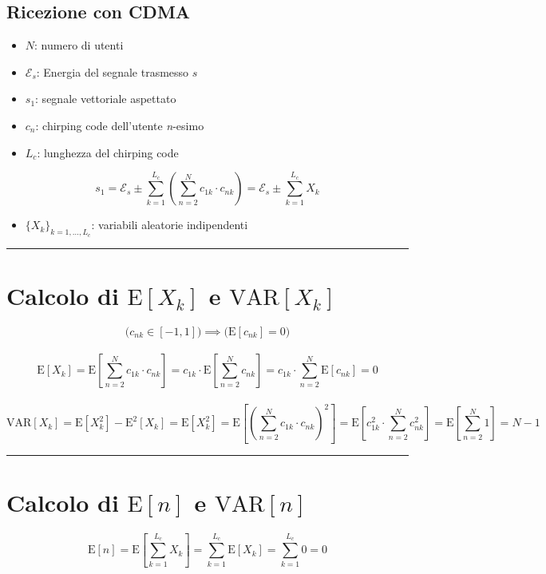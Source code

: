 \documentclass[12pt, a4paper]{article}
\begin{document}
	
\begin{center} \section*{Ricezione con CDMA} \end{center}

\begin{itemize}[itemsep=0pt]
	\item $N$: numero di utenti
	\item $\mathcal{E}_s$: Energia del segnale trasmesso $s$ 
	\item $s_1$: segnale vettoriale aspettato 
	\item $c_n$: chirping code dell'utente \textit{n}-esimo
	\item $L_c$: lunghezza del chirping code
\end{itemize}

\[
s_1 = \mathcal{E}_s \pm \sum_{k=1}^{L_c}\left(\sum_{n=2}^{N}c_{1k}\cdot c_{nk}\right)
  = \mathcal{E}_s \pm \sum_{k=1}^{L_c}X_k
\] 

\begin{itemize}[itemsep=0pt]
	\item $\{X_k\}_{k=1,\dots,L_c}$: variabili aleatorie indipendenti
\end{itemize}
\hrule

\section{Calcolo di $\mathrm{E}[X_k]$ e $\mathrm{VAR}[X_k]$}
\[
\Bigg( c_{nk}\in [-1,1] \Bigg) \implies \Bigg( \mathrm{E}[c_{nk}] = 0 \Bigg)
\] \\\vspace{-.5cm} \[
\mathrm{\mathrm{E}}[X_k] = \mathrm{E}\left[\sum_{n=2}^{N}c_{1k}\cdot c_{nk}\right] 
       = c_{1k}\cdot \mathrm{E}\left[\sum_{n=2}^{N}c_{nk}\right]
       = c_{1k}\cdot \sum_{n=2}^{N}\mathrm{E}[c_{nk}] 
       = 0
\] \\\vspace{-.5cm} \[
\mathrm{VAR}[X_k] = \mathrm{E}[X_k^2] - \mathrm{E}^2[X_k] = \mathrm{E}[X_k^2] = \mathrm{E}\left[\left(\sum_{n=2}^{N}c_{1k}\cdot c_{nk}\right)^2\right] =
\mathrm{E}\left[ c_{1k}^2\cdot \sum_{n=2}^{N}c_{nk}^2 \right] =
\mathrm{E}\left[ \sum_{n=2}^{N}1 \right] =
N-1
\]
\hrule
	
\section{Calcolo di $\mathrm{E}[n]$ e $\mathrm{VAR}[n]$}
\[
\mathrm{E}[n] = \mathrm{E}\left[ \sum_{k=1}^{L_c}X_k \right] =
\sum_{k=1}^{L_c}\mathrm{E}\left[ X_k \right] = \sum_{k=1}^{L_c}0 = 0
\] \\\vspace{-1.3cm} 
\end{document}
